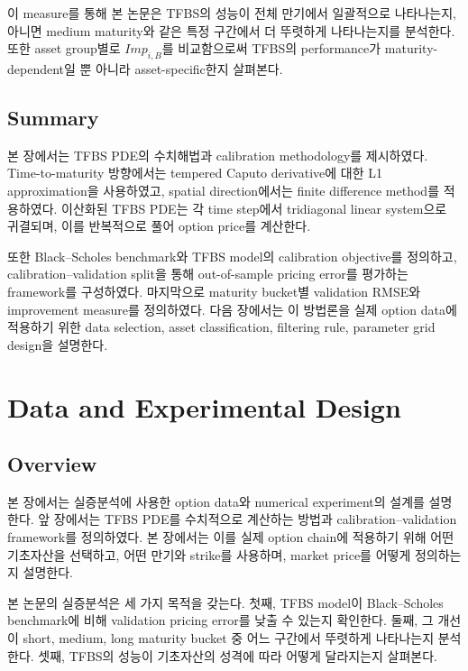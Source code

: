 \documentclass[11pt,a4paper]{report}
\begin{document}
이 measure를 통해 본 논문은 TFBS의 성능이 전체 만기에서 일괄적으로 나타나는지, 아니면 medium maturity와 같은 특정 구간에서 더 뚜렷하게 나타나는지를 분석한다. 또한 asset group별로 $Imp_{i,B}$를 비교함으로써 TFBS의 performance가 maturity-dependent일 뿐 아니라 asset-specific한지 살펴본다.

\section{Summary}

본 장에서는 TFBS PDE의 수치해법과 calibration methodology를 제시하였다. Time-to-maturity 방향에서는 tempered Caputo derivative에 대한 L1 approximation을 사용하였고, spatial direction에서는 finite difference method를 적용하였다. 이산화된 TFBS PDE는 각 time step에서 tridiagonal linear system으로 귀결되며, 이를 반복적으로 풀어 option price를 계산한다.

또한 Black--Scholes benchmark와 TFBS model의 calibration objective를 정의하고, calibration--validation split을 통해 out-of-sample pricing error를 평가하는 framework를 구성하였다. 마지막으로 maturity bucket별 validation RMSE와 improvement measure를 정의하였다. 다음 장에서는 이 방법론을 실제 option data에 적용하기 위한 data selection, asset classification, filtering rule, parameter grid design을 설명한다.














\chapter{Data and Experimental Design}

\section{Overview}

본 장에서는 실증분석에 사용한 option data와 numerical experiment의 설계를 설명한다. 앞 장에서는 TFBS PDE를 수치적으로 계산하는 방법과 calibration--validation framework를 정의하였다. 본 장에서는 이를 실제 option chain에 적용하기 위해 어떤 기초자산을 선택하고, 어떤 만기와 strike를 사용하며, market price를 어떻게 정의하는지 설명한다.

본 논문의 실증분석은 세 가지 목적을 갖는다. 첫째, TFBS model이 Black--Scholes benchmark에 비해 validation pricing error를 낮출 수 있는지 확인한다. 둘째, 그 개선이 short, medium, long maturity bucket 중 어느 구간에서 뚜렷하게 나타나는지 분석한다. 셋째, TFBS의 성능이 기초자산의 성격에 따라 어떻게 달라지는지 살펴본다.
\end{document}
